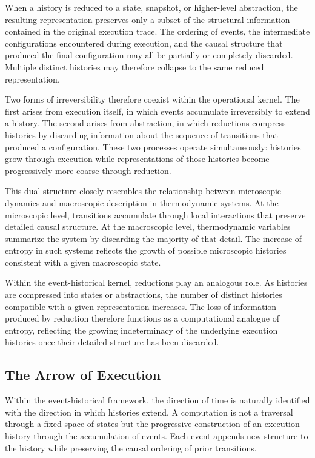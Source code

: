 \documentclass[12pt]{article}
\begin{document}
When a history is reduced to a state, snapshot, or higher-level
abstraction, the resulting representation preserves only a
subset of the structural information contained in the original
execution trace. The ordering of events, the intermediate
configurations encountered during execution, and the causal
structure that produced the final configuration may all be
partially or completely discarded. Multiple distinct histories
may therefore collapse to the same reduced representation.

Two forms of irreversibility therefore coexist within the
operational kernel. The first arises from execution itself,
in which events accumulate irreversibly to extend a history.
The second arises from abstraction, in which reductions compress
histories by discarding information about the sequence of
transitions that produced a configuration. These two processes
operate simultaneously: histories grow through execution while
representations of those histories become progressively more
coarse through reduction.

This dual structure closely resembles the relationship between
microscopic dynamics and macroscopic description in thermodynamic
systems. At the microscopic level, transitions accumulate through
local interactions that preserve detailed causal structure. At
the macroscopic level, thermodynamic variables summarize the
system by discarding the majority of that detail. The increase
of entropy in such systems reflects the growth of possible
microscopic histories consistent with a given macroscopic state.

Within the event-historical kernel, reductions play an analogous
role. As histories are compressed into states or abstractions,
the number of distinct histories compatible with a given
representation increases. The loss of information produced by
reduction therefore functions as a computational analogue of
entropy, reflecting the growing indeterminacy of the underlying
execution histories once their detailed structure has been
discarded.

\subsection{The Arrow of Execution}

Within the event-historical framework, the direction of time
is naturally identified with the direction in which histories
extend. A computation is not a traversal through a fixed
space of states but the progressive construction of an
execution history through the accumulation of events.
Each event appends new structure to the history while
preserving the causal ordering of prior transitions.
\end{document}

